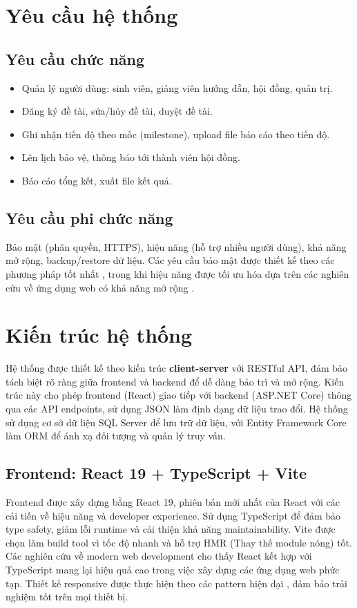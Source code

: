 \documentclass[conference,a4paper]{IEEEtran}
\begin{document}
\section{Yêu cầu hệ thống}
\subsection{Yêu cầu chức năng}
\begin{itemize}
  \item Quản lý người dùng: sinh viên, giảng viên hướng dẫn, hội đồng, quản trị.
  \item Đăng ký đề tài, sửa/hủy đề tài, duyệt đề tài.
  \item Ghi nhận tiến độ theo mốc (milestone), upload file báo cáo theo tiến độ.
  \item Lên lịch bảo vệ, thông báo tới thành viên hội đồng.
  \item Báo cáo tổng kết, xuất file kết quả.
\end{itemize}

\subsection{Yêu cầu phi chức năng}
Bảo mật (phân quyền, HTTPS), hiệu năng (hỗ trợ nhiều người dùng), khả năng mở rộng, backup/restore dữ liệu. Các yêu cầu bảo mật được thiết kế theo các phương pháp tốt nhất \cite{garcia2021security,martinez2023jwt}, trong khi hiệu năng được tối ưu hóa dựa trên các nghiên cứu về ứng dụng web có khả năng mở rộng \cite{lee2022asp}.

\section{Kiến trúc hệ thống}
Hệ thống được thiết kế theo kiến trúc \textbf{client-server} với RESTful API, đảm bảo tách biệt rõ ràng giữa frontend và backend để dễ dàng bảo trì và mở rộng. Kiến trúc này cho phép frontend (React) giao tiếp với backend (ASP.NET Core) thông qua các API endpoints, sử dụng JSON làm định dạng dữ liệu trao đổi. Hệ thống sử dụng cơ sở dữ liệu SQL Server để lưu trữ dữ liệu, với Entity Framework Core làm ORM để ánh xạ đối tượng và quản lý truy vấn.

\subsection{Frontend: React 19 + TypeScript + Vite}
Frontend được xây dựng bằng React 19, phiên bản mới nhất của React với các cải tiến về hiệu năng và developer experience. Sử dụng TypeScript để đảm bảo type safety, giảm lỗi runtime và cải thiện khả năng maintainability. Vite được chọn làm build tool vì tốc độ nhanh và hỗ trợ HMR (Thay thế module nóng) tốt. Các nghiên cứu về modern web development \cite{kim2021react} cho thấy React kết hợp với TypeScript mang lại hiệu quả cao trong việc xây dựng các ứng dụng web phức tạp. Thiết kế responsive được thực hiện theo các pattern hiện đại \cite{gonzalez2023responsive}, đảm bảo trải nghiệm tốt trên mọi thiết bị.
\end{document}
